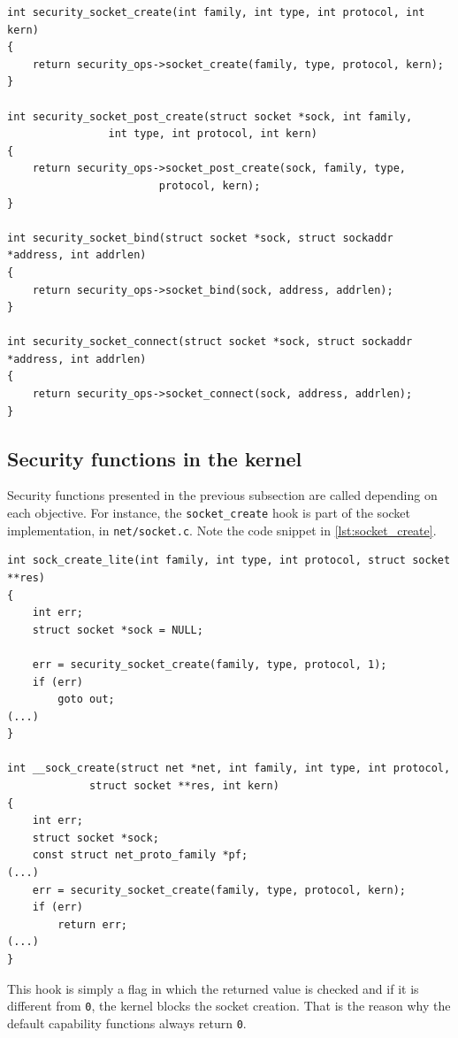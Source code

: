\begin{lstlisting}[frame=none, numbers=none, caption=\texttt{register\_security} function (Linux kernel v3.11), label=lst:security_func_code]
int security_socket_create(int family, int type, int protocol, int kern)
{
	return security_ops->socket_create(family, type, protocol, kern);
}

int security_socket_post_create(struct socket *sock, int family,
				int type, int protocol, int kern)
{
	return security_ops->socket_post_create(sock, family, type,
						protocol, kern);
}

int security_socket_bind(struct socket *sock, struct sockaddr *address, int addrlen)
{
	return security_ops->socket_bind(sock, address, addrlen);
}

int security_socket_connect(struct socket *sock, struct sockaddr *address, int addrlen)
{
	return security_ops->socket_connect(sock, address, addrlen);
}
\end{lstlisting}

\subsection{Security functions in the kernel}
\label{sec:security_func}

Security functions presented in the previous subsection are called depending on each objective. For instance, the \texttt{socket\_create} hook is part of the socket implementation, in \texttt{net/socket.c}. Note the code snippet in \autoref{lst:socket_create}.

\begin{lstlisting}[frame=none, numbers=none, caption=\texttt{socket\_create} hook in socket implementation (Linux kernel v3.11), label=lst:socket_create]
int sock_create_lite(int family, int type, int protocol, struct socket **res)
{
	int err;
	struct socket *sock = NULL;

	err = security_socket_create(family, type, protocol, 1);
	if (err)
		goto out;
(...)
}

int __sock_create(struct net *net, int family, int type, int protocol,
			 struct socket **res, int kern)
{
	int err;
	struct socket *sock;
	const struct net_proto_family *pf;
(...)
	err = security_socket_create(family, type, protocol, kern);
	if (err)
		return err;
(...)
}
\end{lstlisting}

\noindent
This hook is simply a flag in which the returned value is checked and if it is different from \texttt{0}, the kernel blocks the socket creation. That is the reason why the default capability functions always return \texttt{0}.